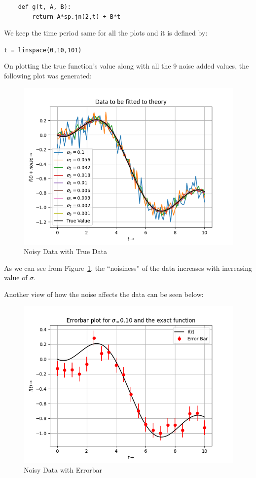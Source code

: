 \documentclass[11pt, a4paper]{article}
\begin{document}
\begin{verbatim}
    def g(t, A, B):
        return A*sp.jn(2,t) + B*t
\end{verbatim}

We keep the time period same for all the plots and it is defined by:

\texttt{t = linspace(0,10,101)}
\newline

On plotting the true function’s value along with all the 9 noise added values, the following plot was generated:

  \begin{figure}[!tbh]
   	\centering
   	\includegraphics[scale=0.5]{figure0.png}  
   	\caption{Noisy Data with True Data}
   	\label{fig:fig1}
   \end{figure} 

As we can see from Figure~\ref{fig:fig1}, the “noisiness” of the data increases with increasing value of $\sigma$. 

Another view of how the noise affects the data can be seen below: 

  \begin{figure}[!tbh]
   	\centering
   	\includegraphics[scale=0.5]{figure1.png}  
   	\caption{Noisy Data with Errorbar}
   	\label{fig:fig2}
   \end{figure} 
   
\end{document}

